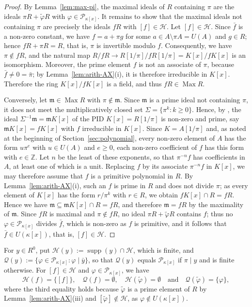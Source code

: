 \documentclass[12pt,reqno,a4paper]{amsart}
\newcommand{\Z}{\mathbb{Z}}
\newcommand{\Pe}{\mathcal{P}}
\newcommand{\m}{\mathfrak{m}}
\DeclareMathOperator{\Max}{Max}
\DeclareMathOperator{\supp}{supp}
\theoremstyle{plain}
\theoremstyle{definition}
\begin{document}
\begin{proof}
By Lemma~\ref{lem:max-pi}, the maximal ideals of $R$ containing $\pi$ are the ideals $\pi R+\tilde\varphi R$ with $\varphi\in\Pe_{\kappa[x]}$. It remains to show that the maximal ideals not containing $\pi$ are precisely the ideals $fR$ with $[f]\in\mathcal{H}$. Let $[f]\in\mathcal{H}$. Since $\bar f$ is a non-zero constant, we have $f=a+\pi g$ for some $a\in A\setminus\pi A=U(A)$ and $g\in R$; hence $fR+\pi R=R$, that is, $\pi$ is invertible modulo $f$. Consequently, we have $\pi\notin fR$, and the natural map $R/fR\rightarrow R[1/\pi]/fR[1/\pi]=K[x]/fK[x]$ is an isomorphism. Moreover, the prime element $f$ is not an associate of $\pi$, because $\bar f\neq0=\bar\pi$; by Lemma~\ref{lem:arith-AX}(i), it is therefore irreducible in $K[x]$. Therefore the ring $K[x]/fK[x]$ is a field, and thus $fR\in\Max R$.

Conversely, let $\m\in\Max R$ with $\pi\notin\m$. Since $\m$ is a prime ideal not containing $\pi$, it does not meet the multiplicatively closed set $\Sigma=\{\pi^k:k\geq0\}$. Hence, by \cite[Proposition~3.11(iv)]{AtiyahMacdonald}, the ideal $\Sigma^{-1}\m=\m K[x]$ of the PID $K[x]=R[1/\pi]$ is non-zero and prime, say $\m K[x]=fK[x]$ with $f$ irreducible in $K[x]$. Since $K=A[1/\pi]$ and, as noted at the beginning of Section~\ref{sec:polynomial}, every non-zero element of $A$ has the form $u\pi^e$ with $u\in U(A)$ and $e\geq0$, each non-zero coefficient of $f$ has this form with $e\in\Z$. Let $n$ be the least of these exponents, so that $\pi^{-n}f$ has coefficients in $A$, at least one of which is a unit. Replacing $f$ by its associate $\pi^{-n}f$ in $K[x]$, we may therefore assume that $f$ is a primitive polynomial in $R$. By Lemma~\ref{lem:arith-AX}(i), such an $f$ is prime in $R$ and does not divide $\pi$; as every element of $K[x]$ has the form $r/\pi^k$ with $r\in R$, we obtain $fK[x]\cap R=fR$. Hence we have $\m\subseteq\m K[x]\cap R=fR$, and therefore $\m=fR$ by the maximality of $\m$. Since $fR$ is maximal and $\pi\notin fR$, no ideal $\pi R+\tilde\varphi R$ contains $f$; thus no $\varphi\in\Pe_{\kappa[x]}$ divides $\bar f$, which is non-zero as $f$ is primitive, and it follows that $\bar f\in U(\kappa[x])$, that is, $[f]\in\mathcal{H}$.
\end{proof}

For $y\in R^0$, put $\mathcal{H}(y):=\supp(y)\cap\mathcal{H}$, which is finite, and $\mathcal{Q}(y):=\{\varphi\in\Pe_{\kappa[x]}:\varphi\mid\bar y\}$, so that $\mathcal{Q}(y)$ equals $\Pe_{\kappa[x]}$ if $\pi\mid y$ and is finite otherwise. For $[f]\in\mathcal{H}$ and $\varphi\in\Pe_{\kappa[x]}$, we have
\begin{equation}\label{eq:HQ}
\mathcal{H}(f)=\{[f]\},\quad\mathcal{Q}(f)=\emptyset,\quad\mathcal{H}(\tilde\varphi)=\emptyset\quad\text{and}\quad\mathcal{Q}(\tilde\varphi)=\{\varphi\},
\end{equation}
where the third equality holds because $\tilde\varphi$ is a prime element of $R$ by Lemma~\ref{lem:arith-AX}(iii) and $[\tilde\varphi]\notin\mathcal{H}$, as $\varphi\notin U(\kappa[x])$.
\end{document}
